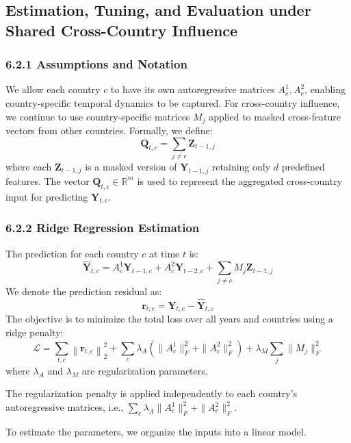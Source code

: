 \documentclass[12pt]{article}
\begin{document}
\subsection{Estimation, Tuning, and Evaluation under Shared Cross-Country Influence}


\subsubsection*{6.2.1 Assumptions and Notation}

We allow each country $c$ to have its own autoregressive matrices $A^1_c, A^2_c$, enabling country-specific temporal dynamics to be captured. For cross-country influence, we continue to use country-specific matrices $M_j$ applied to masked cross-feature vectors from other countries. Formally, we define:
\[
\mathbf{Q}_{t,c} = \sum_{j \ne c} \mathbf{Z}_{t-1,j}
\]
where each $\mathbf{Z}_{t-1,j}$ is a masked version of $\mathbf{Y}_{t-1,j}$ retaining only $d$ predefined features. The vector $\mathbf{Q}_{t,c} \in \mathbb{R}^m$ is used to represent the aggregated cross-country input for predicting $\mathbf{Y}_{t,c}$.


 \subsubsection*{6.2.2 Ridge Regression Estimation}

The prediction for each country $c$ at time $t$ is:
\[
\hat{\mathbf{Y}}_{t,c} = A^1_c \mathbf{Y}_{t-1,c} + A^2_c \mathbf{Y}_{t-2,c} + \sum_{j \ne c} M_j \mathbf{Z}_{t-1,j}
\]
We denote the prediction residual as:
\[
\mathbf{r}_{t,c} = \mathbf{Y}_{t,c} - \hat{\mathbf{Y}}_{t,c}
\]
The objective is to minimize the total loss over all years and countries using a ridge penalty:
\[
\mathcal{L} = \sum_{t,c} \left\| \mathbf{r}_{t,c} \right\|_2^2 + \sum_c \lambda_A \left( \|A^1_c\|_F^2 + \|A^2_c\|_F^2 \right) + \lambda_M \sum_j \|M_j\|_F^2
\]
where $\lambda_A$ and $\lambda_M$ are regularization parameters.

The regularization penalty is applied independently to each country's autoregressive matrices, i.e., $\sum_c \lambda_A \|A^1_c\|_F^2 + \|A^2_c\|_F^2$.

To estimate the parameters, we organize the inputs into a linear model.
\end{document}
